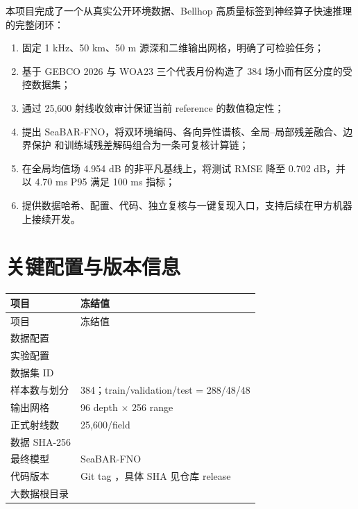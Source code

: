 \documentclass[UTF8,11pt]{ctexart}
\newcommand{\BestModel}{SeaBAR-FNO}
\newcommand{\BestRMSE}{0.702}
\newcommand{\GlobalBaseline}{4.954}
\newcommand{\GpuPninetyfive}{4.70}
\begin{document}
本项目完成了一个从真实公开环境数据、Bellhop 高质量标签到神经算子快速推理的完整闭环：
\begin{enumerate}
  \item 固定 1 kHz、50 km、50 m 源深和二维输出网格，明确了可检验任务；
  \item 基于 GEBCO 2026 与 WOA23 三个代表月份构造了 384 场小而有区分度的受控数据集；
  \item 通过 25,600 射线收敛审计保证当前 reference 的数值稳定性；
  \item 提出 SeaBAR-FNO，将双环境编码、各向异性谱核、全局--局部残差融合、边界保护
  和训练域残差解码组合为一条可复核计算链；
  \item 在全局均值场 \GlobalBaseline{} dB 的非平凡基线上，将测试 RMSE 降至
  \BestRMSE{} dB，并以 \GpuPninetyfive{} ms P95 满足 100 ms 指标；
  \item 提供数据哈希、配置、代码、独立复核与一键复现入口，支持后续在甲方机器上接续开发。
\end{enumerate}

\appendix
\section{关键配置与版本信息}

\begin{longtable}{L{4.4cm}L{9.6cm}}
\toprule
项目 & 冻结值 \\
\midrule
\endfirsthead
\toprule
项目 & 冻结值 \\
\midrule
\endhead
数据配置 &  \\
实验配置 &  \\
数据集 ID &  \\
样本数与划分 & 384；train/validation/test = 288/48/48 \\
输出网格 & 96 depth $\times$ 256 range \\
正式射线数 & 25,600/field \\
数据 SHA-256 &  \\
最终模型 & \BestModel \\
代码版本 & Git tag ，具体 SHA 见仓库 release \\
大数据根目录 &  \\
\bottomrule
\end{longtable}
\end{document}
